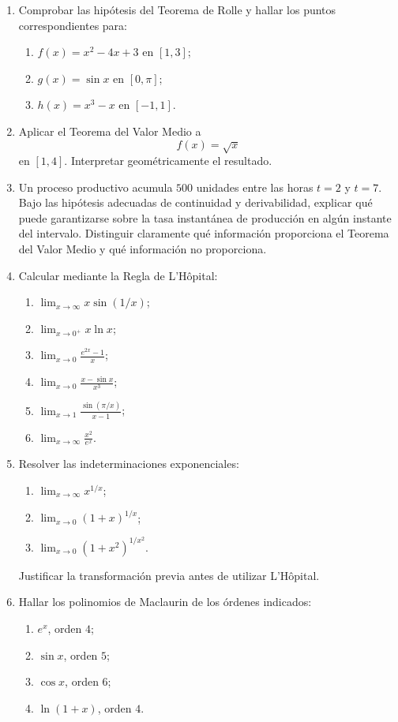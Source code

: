 \begin{enumerate}[label=\textbf{\arabic*.},leftmargin=*]
\item Comprobar las hipótesis del Teorema de Rolle y hallar los puntos correspondientes para:
\begin{enumerate}[label=\alph*)]
\item $f(x)=x^2-4x+3$ en $[1,3]$;
\item $g(x)=\sin x$ en $[0,\pi]$;
\item $h(x)=x^3-x$ en $[-1,1]$.
\end{enumerate}

\item Aplicar el Teorema del Valor Medio a
\[
f(x)=\sqrt{x}
\]
en $[1,4]$. Interpretar geométricamente el resultado.

\item Un proceso productivo acumula $500$ unidades entre las horas $t=2$ y $t=7$. Bajo las hipótesis adecuadas de continuidad y derivabilidad, explicar qué puede garantizarse sobre la tasa instantánea de producción en algún instante del intervalo. Distinguir claramente qué información proporciona el Teorema del Valor Medio y qué información no proporciona.

\item Calcular mediante la Regla de L'Hôpital:
\begin{enumerate}[label=\alph*)]
\item $\displaystyle\lim_{x\to\infty}x\sin(1/x)$;
\item $\displaystyle\lim_{x\to0^+}x\ln x$;
\item $\displaystyle\lim_{x\to0}\frac{e^{2x}-1}{x}$;
\item $\displaystyle\lim_{x\to0}\frac{x-\sin x}{x^3}$;
\item $\displaystyle\lim_{x\to1}\frac{\sin(\pi/x)}{x-1}$;
\item $\displaystyle\lim_{x\to\infty}\frac{x^2}{e^x}$.
\end{enumerate}

\item Resolver las indeterminaciones exponenciales:
\begin{enumerate}[label=\alph*)]
\item $\displaystyle\lim_{x\to\infty}x^{1/x}$;
\item $\displaystyle\lim_{x\to0}(1+x)^{1/x}$;
\item $\displaystyle\lim_{x\to0}(1+x^2)^{1/x^2}$.
\end{enumerate}
Justificar la transformación previa antes de utilizar L'Hôpital.

\item Hallar los polinomios de Maclaurin de los órdenes indicados:
\begin{enumerate}[label=\alph*)]
\item $e^x$, orden $4$;
\item $\sin x$, orden $5$;
\item $\cos x$, orden $6$;
\item $\ln(1+x)$, orden $4$.
\end{enumerate}


\end{enumerate}
